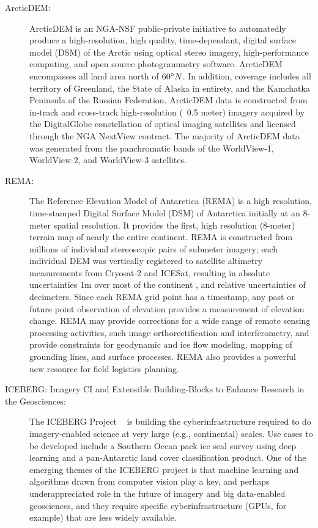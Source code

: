 \documentclass[10pt,letterpaper,draft]{article}
\begin{document}
\begin{description}
  \item [ArcticDEM:] ArcticDEM is an NGA-NSF public-private initiative to automatedly produce a high-resolution, high quality, time-dependant, digital surface model (DSM) of the Arctic using optical stereo imagery, high-performance computing, and open source photogrammetry software. ArcticDEM encompasses all land area north of $60\degree N$. In addition, coverage includes all territory of Greenland, the State of Alaska in entirety, and the Kamchatka Peninsula of the Russian Federation. ArcticDEM data is constructed from in-track and cross-track high-resolution (~0.5 meter) imagery acquired by the DigitalGlobe constellation of optical imaging satellites and licensed through the NGA NextView contract. The majority of ArcticDEM data was generated from the panchromatic bands of the WorldView-1, WorldView-2, and WorldView-3 satellites. 
  
  \item [REMA:] The Reference Elevation Model of Antarctica (REMA) is a high resolution, time-stamped Digital Surface Model (DSM) of Antarctica initially at an 8-meter spatial resolution. It provides the first, high resolution (8-meter) terrain map of nearly the entire continent. REMA is constructed from millions of individual stereoscopic pairs of submeter imagery; each individual DEM was vertically registered to satellite altimetry measurements from Cryosat-2 and ICESat, resulting in absolute uncertainties   1m over most of the continent , and relative uncertainties of decimeters. Since each REMA grid point has a timestamp, any past or future point observation of elevation provides a measurement of elevation change. REMA may provide corrections for a wide range of remote sensing processing activities, such image orthorectification and interferometry, and provide constraints for geodynamic and ice flow modeling, mapping of grounding lines, and surface processes. REMA also provides a powerful new resource for field logistics planning.

\item [ICEBERG: Imagery CI and Extensible Building-Blocks to Enhance Research in the Geosciences:]                                           
The ICEBERG Project ~\cite{Hackathon} is building the cyberinfrastructure required to do imagery-enabled science at very large (e.g., continental) scales. Use cases to be developed include a Southern Ocean pack ice seal survey using deep learning and a pan-Antarctic land cover classification product. One of the emerging themes of the ICEBERG project is that machine learning and algorithms drawn from computer vision play a key, and perhaps underappreciated role in the future of imagery and big data-enabled geosciences, and they require specific cyberinfrastructure (GPUs, for example) that are less widely available.
 

\end{description}
\end{document}
